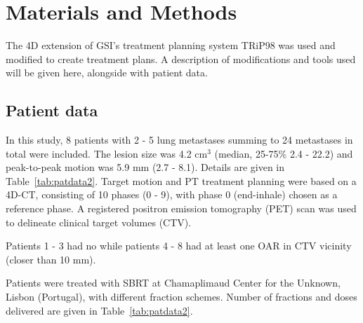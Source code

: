 \documentclass[type=dr, dr=rernat, accentcolor=tud7b,colorbacktitle, bigchapter, openright, twoside, 12pt ]{tudthesis}
\begin{document}
\newpage
\section{Materials and Methods}

The 4D extension of GSI's treatment planning system TRiP98 \cite{Kraemer2000a, Richter2013} was used and modified to create treatment plans. A description of modifications and tools used will be given here, 
alongside with patient data.

\subsection{Patient data}


In this study, 8 patients with 2 - 5 lung metastases summing to 24 metastases in total were included. The lesion size was 4.2 cm$^3$ (median, 25-75\% 2.4 - 22.2) and peak-to-peak motion was 5.9 mm (2.7 - 8.1). 
Details are given in Table~\ref{tab:patdata2}.
Target motion and PT treatment planning were based on a 4D-CT, consisting of 10 phases (0 - 9), with phase 0 (end-inhale) chosen as a reference phase.
A registered positron emission tomography (PET) scan was used to delineate clinical target volumes (CTV). 

Patients 1 - 3 had no while patients 4 - 8 had at least one OAR in CTV vicinity (closer than 10 mm).

Patients were treated with SBRT at Chamaplimaud Center for the Unknown, Lisbon (Portugal), with different fraction schemes. 
Number of fractions and doses delivered are given in Table~\ref{tab:patdata2}.

\newpage
\end{document}
